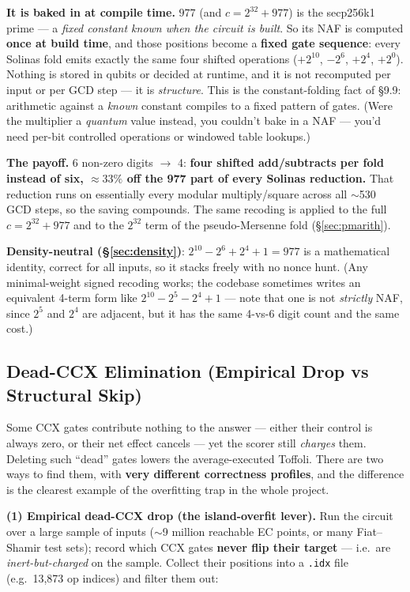 \documentclass[11pt,a4paper]{article}
\begin{document}
\textbf{It is baked in at compile time.} $977$ (and $c = 2^{32} + 977$) is the secp256k1 prime --- a
\emph{fixed constant known when the circuit is built}. So its NAF is computed \textbf{once at build
time}, and those positions become a \textbf{fixed gate sequence}: every Solinas fold emits exactly the
same four shifted operations ($+2^{10}$, $-2^6$, $+2^4$, $+2^0$). Nothing is stored in qubits or
decided at runtime, and it is not recomputed per input or per GCD step --- it is \emph{structure}.
This is the constant-folding fact of \S9.9: arithmetic against a \emph{known} constant compiles to a
fixed pattern of gates. (Were the multiplier a \emph{quantum} value instead, you couldn't bake in a
NAF --- you'd need per-bit controlled operations or windowed table lookups.)

\textbf{The payoff.} 6 non-zero digits $\to$ 4: \textbf{four shifted add/subtracts per fold instead of
six, $\approx33\%$ off the 977 part of every Solinas reduction.} That reduction runs on essentially
every modular multiply/square across all $\sim$530 GCD steps, so the saving compounds. The same
recoding is applied to the full $c = 2^{32} + 977$ and to the $2^{32}$ term of the pseudo-Mersenne
fold (\S\ref{sec:pmarith}).

\textbf{Density-neutral (\S\ref{sec:density})}: $2^{10} - 2^6 + 2^4 + 1 = 977$ is a mathematical
identity, correct for all inputs, so it stacks freely with no nonce hunt. (Any minimal-weight signed
recoding works; the codebase sometimes writes an equivalent 4-term form like $2^{10} - 2^5 - 2^4 + 1$
--- note that one is not \emph{strictly} NAF, since $2^5$ and $2^4$ are adjacent, but it has the same
4-vs-6 digit count and the same cost.)

\subsection{Dead-CCX Elimination (Empirical Drop vs Structural Skip)}
\label{sec:deadccx}

Some CCX gates contribute nothing to the answer --- either their control is always zero, or their net
effect cancels --- yet the scorer still \emph{charges} them. Deleting such ``dead'' gates lowers the
average-executed Toffoli. There are two ways to find them, with \textbf{very different correctness
profiles}, and the difference is the clearest example of the overfitting trap in the whole project.

\textbf{(1) Empirical dead-CCX drop (the island-overfit lever).} Run the circuit over a large sample
of inputs ($\sim$9 million reachable EC points, or many Fiat--Shamir test sets); record which CCX
gates \textbf{never flip their target} --- i.e.\ are \emph{inert-but-charged} on the sample. Collect
their positions into a \texttt{.idx} file (e.g.\ 13{,}873 op indices) and filter them out:
\end{document}
